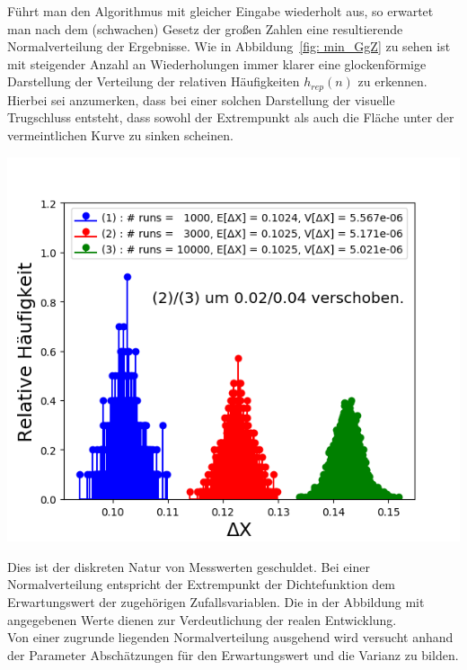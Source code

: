 \noindent
\begin{minipage}[Ht]{.45\textwidth}
Führt man den Algorithmus mit gleicher Eingabe wiederholt aus, so erwartet man nach dem (schwachen) Gesetz der großen Zahlen eine resultierende Normalverteilung der Ergebnisse. Wie in Abbildung~\ref{fig: min_GgZ} zu sehen ist mit steigender Anzahl an Wiederholungen immer klarer eine glockenförmige Darstellung der Verteilung der relativen Häufigkeiten $h_{rep}(n)$ zu erkennen. Hierbei sei anzumerken, dass bei einer solchen Darstellung der visuelle Trugschluss entsteht, dass sowohl der Extrempunkt als auch die Fläche unter der vermeintlichen Kurve zu sinken scheinen.\\[.1cm]
\end{minipage}%
%
\hfill
%
\begin{minipage}[Ht]{.54\textwidth}
        \centering
        \vspace*{-0.5cm}
        \includegraphics[scale=.66]{pictures/min_filter_runs.png}
   		\vspace*{-8mm}
   		\label{fig: min_GgZ}

\end{minipage}

\noindent
Dies ist der diskreten Natur von Messwerten geschuldet. Bei einer Normalverteilung entspricht der Extrempunkt der Dichtefunktion dem Erwartungswert der zugehörigen Zufallsvariablen. Die in der Abbildung mit angegebenen Werte dienen zur Verdeutlichung der realen Entwicklung.\\[.05cm]
Von einer zugrunde liegenden Normalverteilung ausgehend wird versucht anhand der Parameter Abschätzungen für den Erwartungswert und die Varianz zu bilden.\\[.1cm]

